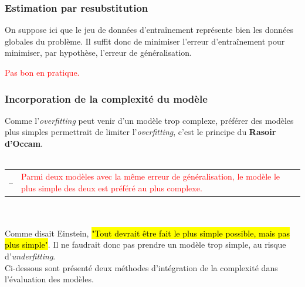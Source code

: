 \documentclass[letterpaper, 12pt]{article}
\newcommand{\alinea}{
\hspace*{0.5cm}}
\newcommand{\red}[1]{
	\textcolor{red}{#1}}
\newcommand{\myul}[1]{
		\underline{\smash{#1}}
	}
\begin{document}
			\subsubsection{Estimation par resubstitution}
			\alinea On suppose ici que le jeu de données d'entraînement
				représente bien les données globales du problème. Il suffit
				donc de minimiser l'erreur d'entraînement pour minimiser,
				par hypothèse, l'erreur de généralisation. 
				\red{Pas bon en pratique.}
			\subsubsection{Incorporation de la complexité du modèle}
			\alinea Comme l'\textit{overfitting} peut venir d'un modèle
				trop complexe, préférer des modèles plus simples permettrait
				de limiter l'\textit{overfitting}, c'est le principe
				du \textbf{Rasoir d'Occam}.\\~\\
				\begin{tabular}{lp{13.5cm}}
					\myul{\textbf{Rasoir d'Occam}}-- & 
						\red{Parmi deux modèles avec la même erreur de 
							 généralisation, le modèle le plus simple des
							 deux est préféré au plus complexe.}
				\end{tabular}~\\~\\
			\alinea Comme disait Einstein, \hl{"Tout devrait être fait le 
				plus simple possible, mais pas plus simple"}. Il ne faudrait
				donc pas prendre un modèle trop simple, au risque 
				d'\textit{underfitting}.\\
			\alinea Ci-dessous sont présenté deux méthodes d'intégration
				de la complexité dans l'évaluation des modèles.
\end{document}
